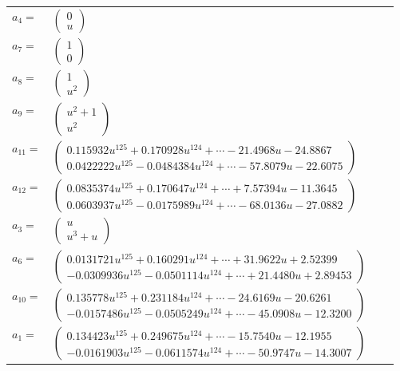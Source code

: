 \documentclass[1p]{elsarticle_modified}
\theoremstyle{definition}
\begin{document}
\begin{tabular}{m{7pt} m{180pt} m{7pt} m{180pt} }
\flushright $a_{4}=$&$\begin{pmatrix}0\\u\end{pmatrix}$ \\
\flushright $a_{7}=$&$\begin{pmatrix}1\\0\end{pmatrix}$ \\
\flushright $a_{8}=$&$\begin{pmatrix}1\\u^2\end{pmatrix}$ \\
\flushright $a_{9}=$&$\begin{pmatrix}u^2+1\\u^2\end{pmatrix}$ \\
\flushright $a_{11}=$&$\begin{pmatrix}0.115932 u^{125}+0.170928 u^{124}+\cdots-21.4968 u-24.8867\\0.0422222 u^{125}-0.0484384 u^{124}+\cdots-57.8079 u-22.6075\end{pmatrix}$ \\
\flushright $a_{12}=$&$\begin{pmatrix}0.0835374 u^{125}+0.170647 u^{124}+\cdots+7.57394 u-11.3645\\0.0603937 u^{125}-0.0175989 u^{124}+\cdots-68.0136 u-27.0882\end{pmatrix}$ \\
\flushright $a_{3}=$&$\begin{pmatrix}u\\u^3+u\end{pmatrix}$ \\
\flushright $a_{6}=$&$\begin{pmatrix}0.0131721 u^{125}+0.160291 u^{124}+\cdots+31.9622 u+2.52399\\-0.0309936 u^{125}-0.0501114 u^{124}+\cdots+21.4480 u+2.89453\end{pmatrix}$ \\
\flushright $a_{10}=$&$\begin{pmatrix}0.135778 u^{125}+0.231184 u^{124}+\cdots-24.6169 u-20.6261\\-0.0157486 u^{125}-0.0505249 u^{124}+\cdots-45.0908 u-12.3200\end{pmatrix}$ \\
\flushright $a_{1}=$&$\begin{pmatrix}0.134423 u^{125}+0.249675 u^{124}+\cdots-15.7540 u-12.1955\\-0.0161903 u^{125}-0.0611574 u^{124}+\cdots-50.9747 u-14.3007\end{pmatrix}$ \\

\end{tabular}
\end{document}
